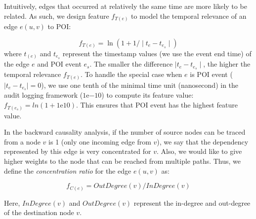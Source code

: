 Intuitively, edges that occurred at relatively the same time are more likely to be related.
As such, we design feature $f_{T(e)}$ to model the temporal relevance of an edge $e(u,v)$ to POI:

\begin{equation}
\label{eq:time-feature}
    f_{T(e)} = \ln(1 + 1/\mid t_{e} - t_{e_s}\mid)
\end{equation}
where $t_{(e)}$ and $t_{e_s}$ represent the timestamp values (we use the event end time) of the edge $e$ and POI event $e_s$. 
The smaller the difference $\mid t_{e} - t_{e_s}\mid$, the higher the temporal relevance $f_{T(e)}$.
%
To handle the special case when $e$ is POI event (\ie $\mid t_{e} - t_{e_s}\mid = 0$), we use one tenth of the minimal time unit (nanosecond) in the audit logging framework (\ie $1\mathrm{e}{-10}$) to compute its feature value: $f_{T(e_s)} = ln(1 + 1\mathrm{e}{10})$. 
This ensures that POI event has the highest feature value.


In the backward causality analysis, if the number of source nodes can be traced from a node $v$ is 1 (\ie only one incoming edge from $v$), we say that the dependency represented by this edge is very concentrated for $v$.
Also, we would like to give higher weights to the node that can be reached from multiple paths.
Thus, we define the \emph{concentration ratio} for the edge $e(u, v)$ as:

\begin{equation}
    \label{eq:structure-feature}
    f_{C(e)} = OutDegree(v)/InDegree(v)
\end{equation}
    
Here, $InDegree(v)$ and $OutDegree(v)$ represent the in-degree and out-degree of the destination node $v$.

%

